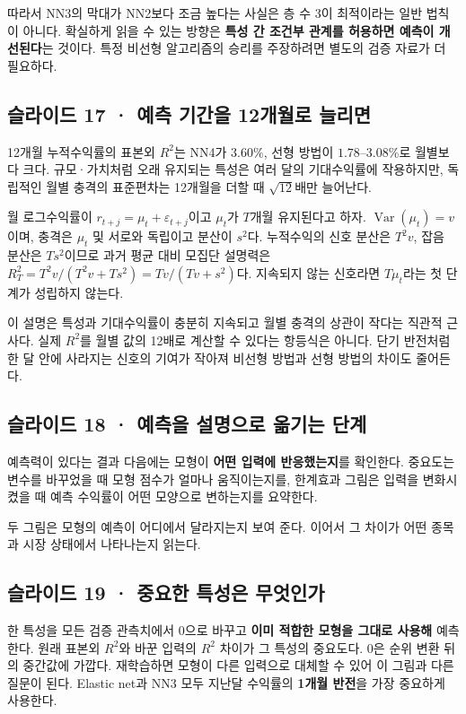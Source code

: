 \documentclass[11pt,a4paper]{article}
\begin{document}
따라서 NN3의 막대가 NN2보다 조금 높다는 사실은 층 수 3이 최적이라는 일반 법칙이 아니다. 확실하게 읽을 수 있는 방향은 \textbf{특성 간 조건부 관계를 허용하면 예측이 개선된다}는 것이다. 특정 비선형 알고리즘의 승리를 주장하려면 별도의 검증 자료가 더 필요하다.\par

\subsection{슬라이드 17 · 예측 기간을 12개월로 늘리면}
12개월 누적수익률의 표본외 $R^2$는 NN4가 $3.60\%$, 선형 방법이 $1.78$–$3.08\%$로 월별보다 크다. 규모·가치처럼 오래 유지되는 특성은 여러 달의 기대수익률에 작용하지만, 독립적인 월별 충격의 표준편차는 12개월을 더할 때 $\sqrt{12}$배만 늘어난다.\par

월 로그수익률이 $r_{t+j}=\mu_t+\varepsilon_{t+j}$이고 $\mu_t$가 $T$개월 유지된다고 하자. $\operatorname{Var}(\mu_t)=v$이며, 충격은 $\mu_t$ 및 서로와 독립이고 분산이 $s^2$다. 누적수익의 신호 분산은 $T^2v$, 잡음 분산은 $Ts^2$이므로 과거 평균 대비 모집단 설명력은 $R_T^2=T^2v/(T^2v+Ts^2)=Tv/(Tv+s^2)$다. 지속되지 않는 신호라면 $T\mu_t$라는 첫 단계가 성립하지 않는다.\par

이 설명은 특성과 기대수익률이 충분히 지속되고 월별 충격의 상관이 작다는 직관적 근사다. 실제 $R^2$를 월별 값의 12배로 계산할 수 있다는 항등식은 아니다. 단기 반전처럼 한 달 안에 사라지는 신호의 기여가 작아져 비선형 방법과 선형 방법의 차이도 줄어든다.\par

\subsection{슬라이드 18 · 예측을 설명으로 옮기는 단계}
예측력이 있다는 결과 다음에는 모형이 \textbf{어떤 입력에 반응했는지}를 확인한다. 중요도는 변수를 바꾸었을 때 모형 점수가 얼마나 움직이는지를, 한계효과 그림은 입력을 변화시켰을 때 예측 수익률이 어떤 모양으로 변하는지를 요약한다.\par

두 그림은 모형의 예측이 어디에서 달라지는지 보여 준다. 이어서 그 차이가 어떤 종목과 시장 상태에서 나타나는지 읽는다.\par

\subsection{슬라이드 19 · 중요한 특성은 무엇인가}
한 특성을 모든 검증 관측치에서 0으로 바꾸고 \textbf{이미 적합한 모형을 그대로 사용해} 예측한다. 원래 표본외 $R^2$와 바꾼 입력의 $R^2$ 차이가 그 특성의 중요도다. 0은 순위 변환 뒤의 중간값에 가깝다. 재학습하면 모형이 다른 입력으로 대체할 수 있어 이 그림과 다른 질문이 된다. Elastic net과 NN3 모두 지난달 수익률의 \textbf{1개월 반전}을 가장 중요하게 사용한다.\par
\end{document}
